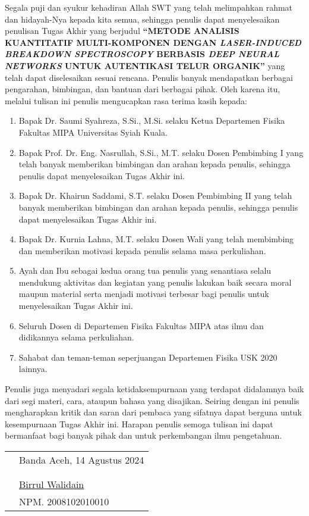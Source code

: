 \preface %


Segala puji dan syukur kehadiran Allah SWT yang telah melimpahkan rahmat dan hidayah-Nya kepada kita semua, sehingga penulis dapat menyelesaikan penulisan Tugas Akhir yang berjudul \MakeUppercase{\textbf{“Metode Analisis Kuantitatif Multi-Komponen dengan \textit{Laser-Induced Breakdown Spectroscopy} Berbasis \textit{Deep Neural Networks} untuk Autentikasi Telur Organik”}} yang telah dapat diselesaikan sesuai rencana. Penulis banyak mendapatkan berbagai pengarahan, bimbingan, dan bantuan dari berbagai pihak. Oleh karena itu, melalui tulisan ini penulis mengucapkan rasa terima kasih kepada:

\begin{enumerate}

	\item {Bapak Dr. Saumi Syahreza, S.Si., M.Si. selaku Ketua Departemen Fisika Fakultas MIPA Universitas Syiah Kuala.}

	\item{Bapak Prof. Dr. Eng. Nasrullah, S.Si., M.T.
 selaku Dosen Pembimbing I yang telah banyak memberikan bimbingan dan arahan kepada penulis, sehingga penulis dapat menyelesaikan Tugas Akhir ini.}
	\item{Bapak Dr. Khairun Saddami, S.T.
 selaku Dosen Pembimbing II yang telah banyak memberikan bimbingan dan arahan kepada penulis, sehingga penulis dapat menyelesaikan Tugas Akhir ini.}

	\item{Bapak Dr. Kurnia Lahna, M.T. selaku Dosen Wali yang telah membimbing
dan memberikan motivasi kepada penulis selama masa perkuliahan.}
  	\item{Ayah dan Ibu sebagai kedua orang tua penulis yang senantiasa selalu mendukung aktivitas dan kegiatan yang penulis lakukan baik secara moral maupun material serta menjadi motivasi terbesar bagi penulis untuk menyelesaikan Tugas Akhir ini.}
	\item{Seluruh Dosen di Departemen Fisika Fakultas MIPA atas ilmu dan didikannya selama perkuliahan.}
	\item{Sahabat dan teman-teman seperjuangan Departemen Fisika USK 2020 lainnya.}
\end{enumerate}


Penulis juga menyadari segala ketidaksempurnaan yang terdapat didalamnya baik dari segi materi, cara, ataupun bahasa yang disajikan. Seiring dengan ini penulis mengharapkan kritik dan saran dari pembaca yang sifatnya dapat berguna untuk kesempurnaan Tugas Akhir ini. Harapan penulis semoga tulisan ini dapat bermanfaat bagi banyak pihak dan untuk perkembangan ilmu pengetahuan.

\vspace{1cm}


\begin{tabular}{p{7.5cm}l}
	&Banda Aceh, 14 Agustus 2024\\
	&\\
	&\\
	&\multirow{1.5}{7.5cm}{\underline{Birrul Walidain}} \\ 
	&NPM. 2008102010010 \\
\end{tabular}
